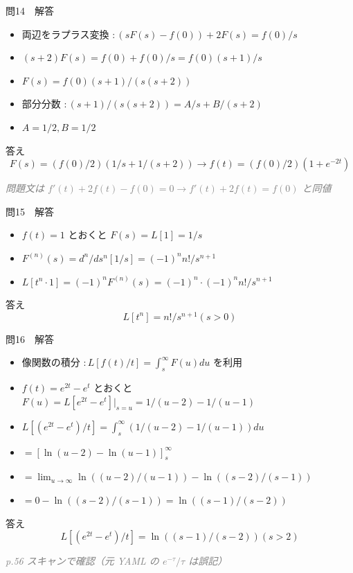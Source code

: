 \documentclass[aspectratio=43,professionalfonts,handout]{beamer}
\begin{document}
\begin{frame}{問14　解答}
  \begin{block}{}
  \begin{itemize}\setlength{\itemsep}{2pt}
    \item 両辺をラプラス変換 $: (sF(s)-f(0)) + 2F(s) = f(0)/s$
    \item $(s+2)F(s) = f(0) + f(0)/s = f(0)(s+1)/s$
    \item $F(s) = f(0)(s+1)/(s(s+2))$
    \item 部分分数 $: (s+1)/(s(s+2)) = A/s + B/(s+2)$
    \item $A = 1/2, B = 1/2$
  \end{itemize}
  \end{block}
  \begin{exampleblock}{答え}
    \[
    F(s) = (f(0)/2)(1/s + 1/(s+2))   \to   f(t) = (f(0)/2)(1 + e^{-2t})
  \]
  \end{exampleblock}
  {\footnotesize \textcolor{gray}{\textit{問題文は $f'(t)+2f(t)-f(0)=0 \to f'(t)+2f(t)=f(0)$ と同値}}}
\end{frame}

\begin{frame}{問15　解答}
  \begin{block}{}
  \begin{itemize}\setlength{\itemsep}{2pt}
    \item $f(t) = 1$ とおくと $F(s) = L[1] = 1/s$
    \item $F^{(n)}(s) = d^n/ds^n [1/s] = (-1)^n n!/s^{n+1}$
    \item $L[t^n\cdot1] = (-1)^n F^{(n)}(s) = (-1)^n\cdot(-1)^n n!/s^{n+1}$
  \end{itemize}
  \end{block}
  \begin{exampleblock}{答え}
    \[
    L[t^n] = n!/s^{n+1}  (s > 0)
  \]
  \end{exampleblock}
\end{frame}

\begin{frame}{問16　解答}
  \begin{block}{}
  \begin{itemize}\setlength{\itemsep}{2pt}
    \item 像関数の積分 $: L[f(t)/t] = \int_{s}^\infty F(u)du$ を利用
    \item $f(t) = e^{2t} - e^t$ とおくと $F(u) = L[e^{2t}-e^t]|_{s=u} = 1/(u-2) - 1/(u-1)$
    \item $L[(e^{2t}-e^t)/t] = \int_{s}^\infty (1/(u-2) - 1/(u-1)) du$
    \item $= [\ln(u-2) - \ln(u-1)]_{s}^\infty$
    \item $= \lim_{u \to \infty} \ln((u-2)/(u-1)) - \ln((s-2)/(s-1))$
    \item $= 0 - \ln((s-2)/(s-1)) = \ln((s-1)/(s-2))$
  \end{itemize}
  \end{block}
  \begin{exampleblock}{答え}
    \[
    L[(e^{2t}-e^t)/t] = \ln((s-1)/(s-2))  (s > 2)
  \]
  \end{exampleblock}
  {\footnotesize \textcolor{gray}{\textit{p.56 スキャンで確認（元 YAML の $e^{-\tau}/\tau$ は誤記）}}}
\end{frame}
\end{document}
